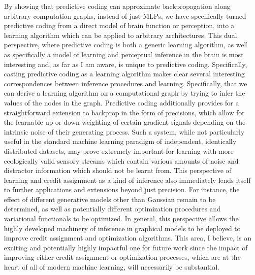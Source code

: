 By showing that predictive coding can approximate backpropagation along arbitrary computation graphs, instead of just MLPs, we have specifically turned predictive coding from a direct model of brain function or perception, into a learning algorithm which can be applied to arbitrary architectures. This dual perspective, where predictive coding is both a generic learning algorithm, as well as specifically a model of learning and perceptual inference in the brain is most interesting and, as far as I am aware, is unique to predictive coding. Specifically, casting predictive coding as a learning algorithm makes clear several interesting correspondences between inference procedures and learning. Specifically, that we can derive a learning algorithm on a computational graph by trying to infer the values of the nodes in the graph. Predictive coding additionally provides for a straightforward extension to backprop in the form of precisions, which allow for the learnable up or down weighting of certain gradient signals depending on the intrinsic noise of their generating process. Such a system, while not particularly useful in the standard machine learning paradigm of independent, identically distributed datasets, may prove extremely important for learning with more ecologically valid sensory streams which contain various amounts of noise and distractor information which should not be learnt from. This perspective of learning and credit assignment as a kind of inference also immediately lends itself to further applications and extensions beyond just precision. For instance, the effect of different generative models other than Gaussian remain to be determined, as well as potentially different optimization procedures and variational functionals to be optimized. In general, this perspective allows the highly developed machinery of inference in graphical models \citep{pearl2014probabilistic,ghahramani2001propagation,beal2003variational,yedidia2011message} to be deployed to improve credit assignment and optimization algorithms. This area, I believe, is an exciting and potentially highly impactful one for future work since the impact of improving either credit assignment or optimization processes, which are at the heart of all of modern machine learning, will necessarily be substantial.


